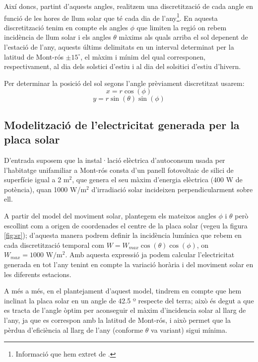 \documentclass[10pt, twoside, a4paper]{article}
\begin{document}
Així doncs, partint d'aquests angles, realitzem una discretització de cada angle en funció de les hores de llum solar que té cada dia de l'any\footnote{Informació que hem extret de \cite{ref5}.}. En aquesta discretització tenim en compte els angles $\phi$ que limiten la regió on rebem incidència de llum solar i els angles $\theta$ màxims als quals arriba el sol depenent de l'estació de l'any, aquests últims delimitats en un interval determinat per la latitud de Mont-rós $\pm 15^\circ$, el màxim i mínim del qual corresponen, respectivament, al dia dels solstici d'estiu i al dia del solsitici d'estiu d'hivern.

Per determinar la posició del sol segons l'angle prèviament discretitzat usarem:
\begin{equation}
    x = r\cos(\phi)
\end{equation}
\begin{equation}
    y = r\sin(\theta)\sin(\phi)
\end{equation}

\subsection{Modelització de l'electricitat generada per la placa solar}
D'entrada suposem que la instal·lació elèctrica d'autoconsum usada per l'habitatge unifamiliar a Mont-rós consta d'un panell fotovoltaic de silici de superfície igual a 2 m$^2$, que genera el seu màxim d'energia elèctrica (400 W de potència), quan 1000 W/m$^2$ d'irradiació solar incideixen perpendicularment sobre ell.

A partir del model del moviment solar, plantegem els mateixos angles $\phi$ i $\theta$ però escollint com a origen de coordenades el centre de la placa solar (vegeu la figura \ref{fig:sr}); d'aquesta manera podrem definir la incidència lumínica que rebem en cada discretització temporal com $W = W_{max}\cos(\theta)\cos(\phi)$, on $W_{max} = 1000 \text{ W/m$^2$}$. Amb aquesta expressió ja podem calcular l'electricitat generada en tot l'any tenint en compte la variació horària i del moviment solar en les diferents estacions.

A més a més, en el plantejament d'aquest model, tindrem en compte que  hem inclinat la placa solar en un angle de 42.5 º respecte del terra; això és degut a que es tracta de l'angle òptim per aconseguir el màxim d'incidencia solar al llarg de l'any, ja que es correspon amb la latitud de Mont-rós, i això permet que la pèrdua d'eficiència al llarg de l'any (conforme $\theta$ va variant) sigui mínima.
\end{document}
